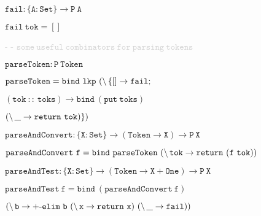 \hspace{0.25cm}
{\small{$\mathtt{fail : \{A : Set\} \to P ~A}$}}

\hspace{0.25cm}
{\small{$\mathtt{fail ~tok = []}$}}

\newpage

\hspace{0.25cm}
{\small{\textcolor{lightgray}{- - $\mathtt{some ~useful ~combinators ~for ~parsing ~tokens}$}}}

\hspace{0.25cm}
{\small{$\mathtt{parseToken : P ~Token}$}}

\hspace{0.25cm}
{\small{$\mathtt{parseToken = bind ~ lkp ~ (\char`\\ \, \{ [] \to fail;}$}}

\vspace{-0.1cm}

\hspace{4.9cm}
{\small{$\mathtt{(tok ~::~ toks) \to bind ~(put ~toks)}$}}

\vspace{-0.1cm}

\hspace{8.65cm}
{\small{$\mathtt{ (\char`\\ \, \_ \to return ~tok) \})}$}}

\vspace{0.25cm}

\hspace{0.25cm}
{\small{$\mathtt{parseAndConvert : \{X : Set\} \to (Token \to X) \to P ~X}$}}

\hspace{0.25cm}
{\small{$\mathtt{parseAndConvert ~ f = bind ~parseToken ~(\char`\\ \,tok \to return ~(f ~tok))}$}}

\vspace{0.25cm}

\hspace{0.25cm}
{\small{$\mathtt{parseAndTest : \{X : Set\} \to (Token \to X + One) \to P ~X}$}}

\hspace{0.25cm}
{\small{$\mathtt{parseAndTest ~f = bind ~(parseAndConvert ~f)}$}}

\vspace{-0.1cm}

\hspace{4.35cm}
{\small{$\mathtt{(\char`\\ \, b \to +\text{-}elim ~b ~(\char`\\ \, x \to return ~x) ~(\char`\\ \, \_ \to fail))}$}}

